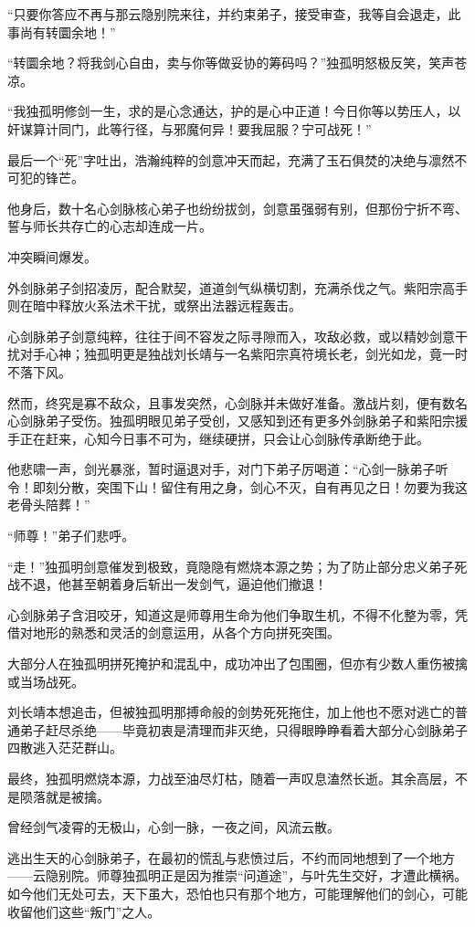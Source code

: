 “只要你答应不再与那云隐别院来往，并约束弟子，接受审查，我等自会退走，此事尚有转圜余地！”

“转圜余地？将我剑心自由，卖与你等做妥协的筹码吗？”独孤明怒极反笑，笑声苍凉。

“我独孤明修剑一生，求的是心念通达，护的是心中正道！今日你等以势压人，以奸谋算计同门，此等行径，与邪魔何异！要我屈服？宁可战死！”

最后一个“死”字吐出，浩瀚纯粹的剑意冲天而起，充满了玉石俱焚的决绝与凛然不可犯的锋芒。

他身后，数十名心剑脉核心弟子也纷纷拔剑，剑意虽强弱有别，但那份宁折不弯、誓与师长共存亡的心志却连成一片。

冲突瞬间爆发。

外剑脉弟子剑招凌厉，配合默契，道道剑气纵横切割，充满杀伐之气。紫阳宗高手则在暗中释放火系法术干扰，或祭出法器远程轰击。

心剑脉弟子剑意纯粹，往往于间不容发之际寻隙而入，攻敌必救，或以精妙剑意干扰对手心神；独孤明更是独战刘长靖与一名紫阳宗真符境长老，剑光如龙，竟一时不落下风。

然而，终究是寡不敌众，且事发突然，心剑脉并未做好准备。激战片刻，便有数名心剑脉弟子受伤。独孤明眼见弟子受创，又感知到还有更多外剑脉弟子和紫阳宗援手正在赶来，心知今日事不可为，继续硬拼，只会让心剑脉传承断绝于此。

他悲啸一声，剑光暴涨，暂时逼退对手，对门下弟子厉喝道：“心剑一脉弟子听令！即刻分散，突围下山！留住有用之身，剑心不灭，自有再见之日！勿要为我这老骨头陪葬！”

“师尊！”弟子们悲呼。

“走！”独孤明剑意催发到极致，竟隐隐有燃烧本源之势；为了防止部分忠义弟子死战不退，他甚至朝着身后斩出一发剑气，逼迫他们撤退！

心剑脉弟子含泪咬牙，知道这是师尊用生命为他们争取生机，不得不化整为零，凭借对地形的熟悉和灵活的剑意运用，从各个方向拼死突围。

大部分人在独孤明拼死掩护和混乱中，成功冲出了包围圈，但亦有少数人重伤被擒或当场战死。

刘长靖本想追击，但被独孤明那搏命般的剑势死死拖住，加上他也不愿对逃亡的普通弟子赶尽杀绝——毕竟初衷是清理而非灭绝，只得眼睁睁看着大部分心剑脉弟子四散逃入茫茫群山。

最终，独孤明燃烧本源，力战至油尽灯枯，随着一声叹息溘然长逝。其余高层，不是陨落就是被擒。

曾经剑气凌霄的无极山，心剑一脉，一夜之间，风流云散。

\vspace{2em}

逃出生天的心剑脉弟子，在最初的慌乱与悲愤过后，不约而同地想到了一个地方——云隐别院。师尊独孤明正是因为推崇“问道途”，与叶先生交好，才遭此横祸。如今他们无处可去，天下虽大，恐怕也只有那个地方，可能理解他们的剑心，可能收留他们这些“叛门”之人。

